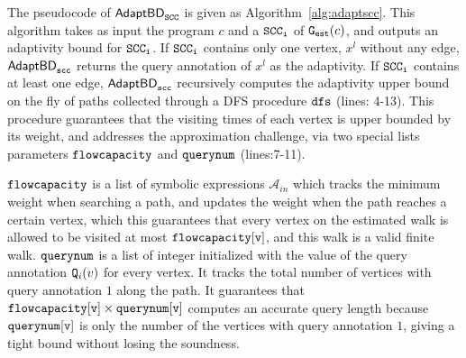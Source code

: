 The pseudocode of $\mathsf{AdaptBD}_{\mathtt{SCC}}$ is given as Algorithm~\ref{alg:adaptscc}.
This algorithm takes as input the program $c$ and a $\mathtt{SCC_i}$ of
$\mathtt{{G_{est}}}(c)$, and outputs an adaptivity bound for $\mathtt{SCC_i}$. 
If $\mathtt{SCC_i}$ contains only one vertex, $x^l$ without any edge, $\mathtt{\mathsf{AdaptBD}_{scc}}$ returns the query annotation of $x^l$ as the adaptivity.
If $\mathtt{SCC_i}$ contains at least one edge, 
$\mathtt{\mathsf{AdaptBD}_{scc}}$
recursively computes the adaptivity upper bound on the fly of paths collected through a DFS procedure $\mathtt{dfs}$ (lines: 4-13). This procedure guarantees that the visiting times of each vertex is upper bounded by its weight, and addresses the approximation challenge,
via two special lists parameters $\mathtt{flowcapacity}$ and $\mathtt{querynum}$ (lines:7-11).
 
 
$\mathtt{flowcapacity}$ is a list of symbolic expressions $\mathcal{A}_{in}$ which tracks the minimum weight
when searching a path,
and updates the weight when the path reaches a certain vertex, which this guarantees that every vertex on the estimated walk is allowed to be visited at most $\mathtt{flowcapacity[v]}$, and this walk is a valid finite walk.
%
$\mathtt{querynum}$ is a list of integer
initialized with the value of the query annotation $\mathtt{Q}_i(v)$ for every vertex. 
It tracks the total number of vertices with query annotation $1$
along the path. It guarantees that $\mathtt{flowcapacity[v] \times querynum[v]}$ computes an accurate query length
because $\mathtt{querynum[v]}$ is only the number of the vertices with query annotation $1$,
giving a tight bound without losing the soundness.
%

